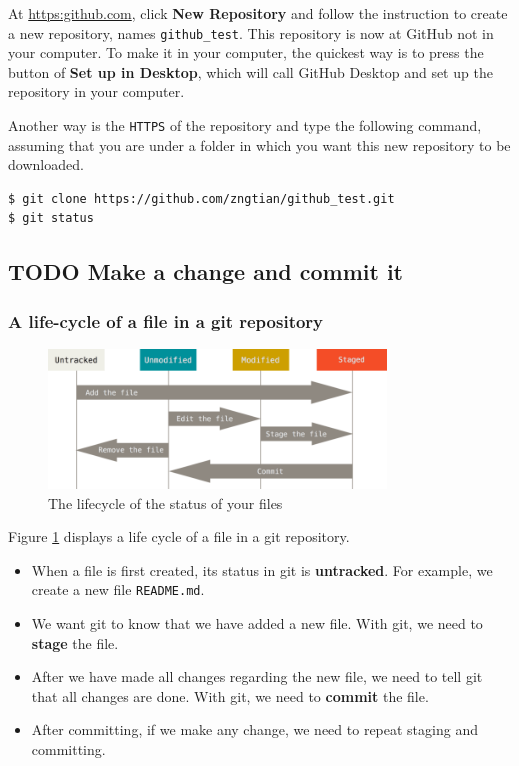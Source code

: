 \documentclass[a4paper,11pt]{article}
\begin{document}
At \url{https:github.com}, click \textbf{New Repository} and follow the instruction
to create a new repository, names \texttt{github\_test}. This repository is
now at GitHub not in your computer. To make it in your computer, the
quickest way is to press the button of \textbf{Set up in Desktop}, which will
call GitHub Desktop and set up the repository in your computer.

Another way is the \texttt{HTTPS} of the repository and type the following
command, assuming that you are under a folder in which you want this new
repository to be downloaded.
\begin{verbatim}
$ git clone https://github.com/zngtian/github_test.git
$ git status
\end{verbatim}


\subsection{{\bfseries\sffamily TODO} Make a change and commit it}
\label{sec:orgf8d3668}

\subsubsection*{A life-cycle of a file in a git repository}
\label{sec:org130743d}

\begin{figure}[htbp]
\centering
\includegraphics[width=0.8\textwidth]{img/lifecycle.png}
\caption{\label{fig:orgb95c3c7}
The lifecycle of the status of your files}
\end{figure}

Figure \ref{fig:orgb95c3c7}  displays a life cycle of a file in a git
repository.
\begin{itemize}
\item When a file is first created, its status in git is \textbf{untracked}. For
example, we create a new file \texttt{README.md}.
\item We want git to know that we have added a new file. With git, we need
to \textbf{stage} the file.
\item After we have made all changes regarding the new file, we need to
tell git that all changes are done. With git, we need to \textbf{commit}
the file.
\item After committing, if we make any change, we need to repeat staging
and committing.
\end{itemize}
\end{document}
